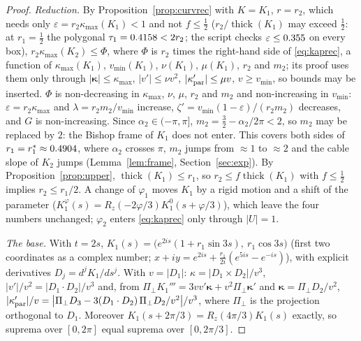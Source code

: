 \documentclass[10pt,a4paper]{article}
\theoremstyle{plain}
\theoremstyle{definition}
\theoremstyle{remark}
\newcommand{\thick}{\operatorname{thick}}
\begin{document}
\begin{proof}
\emph{Reduction.} By Proposition~\ref{prop:curvrec} with $K=K_1$, $r=r_2$, which needs only $\varepsilon=r_2\kappa_{\max}(K_1)<1$ and not $f\le\frac12$ ($r_2/\thick(K_1)$ may exceed $\frac12$: at $r_1=\frac12$ the polygonal $\tau_1=0.4158<2r_2$; the script checks $\varepsilon\le0.355$ on every box), $r_2\kappa_{\max}(K_2)\le\Phi$, where $\Phi$ is $r_2$ times the right-hand side of \eqref{eq:kaprec}, a function of $\kappa_{\max}(K_1)$, $v_{\min}(K_1)$, $\nu(K_1)$, $\mu(K_1)$, $r_2$ and $m_2$; its proof uses them only through $|\boldsymbol\kappa|\le\kappa_{\max}$, $|v'|\le\nu v^2$, $|\kappa_{\rm par}'|\le\mu v$, $v\ge v_{\min}$, so bounds may be inserted. $\Phi$ is non-decreasing in $\kappa_{\max}$, $\nu$, $\mu$, $r_2$ and $m_2$ and non-increasing in $v_{\min}$: $\varepsilon=r_2\kappa_{\max}$ and $\lambda=r_2m_2/v_{\min}$ increase, $\zeta'=v_{\min}(1-\varepsilon)/(r_2m_2)$ decreases, and $G$ is non-increasing. Since $\alpha_2\in(-\pi,\pi]$, $m_2=\frac32-\alpha_2/2\pi<2$, so $m_2$ may be replaced by $2$: the Bishop frame of $K_1$ does not enter. This covers both sides of $r_1=r_1^\ast\approx0.4904$, where $\alpha_2$ crosses $\pi$, $m_2$ jumps from $\approx1$ to $\approx2$ and the cable slope of $K_2$ jumps (Lemma~\ref{lem:frame}, Section~\ref{sec:exp}). By Proposition~\ref{prop:upper}, $\thick(K_1)\le r_1$, so $r_2\le f\thick(K_1)$ with $f\le\frac12$ implies $r_2\le r_1/2$. A change of $\varphi_1$ moves $K_1$ by a rigid motion and a shift of the parameter ($K_1^{\varphi}(s)=R_z(-2\varphi/3)K_1^{0}(s+\varphi/3)$), which leave the four numbers unchanged; $\varphi_2$ enters \eqref{eq:kaprec} only through $|U|=1$.

\emph{The base.} With $t=2s$, $K_1(s)=\bigl(e^{2is}(1+r_1\sin3s),\ r_1\cos3s\bigr)$ (first two coordinates as a complex number; $x+iy=e^{2is}+\frac{r_1}{2i}(e^{5is}-e^{-is})$), with explicit derivatives $D_j=d^jK_1/ds^j$. With $v=|D_1|$: $\kappa=|D_1\times D_2|/v^3$, $|v'|/v^2=|D_1\cdot D_2|/v^3$ and, from $\Pi_\perp K_1'''=3vv'\boldsymbol\kappa+v^2\Pi_\perp\boldsymbol\kappa'$ and $\boldsymbol\kappa=\Pi_\perp D_2/v^2$, $|\kappa_{\rm par}'|/v=\bigl|\Pi_\perp D_3-3(D_1\cdot D_2)\,\Pi_\perp D_2/v^2\bigr|/v^3$, where $\Pi_\perp$ is the projection orthogonal to $D_1$. Moreover $K_1(s+2\pi/3)=R_z(4\pi/3)K_1(s)$ exactly, so suprema over $[0,2\pi]$ equal suprema over $[0,2\pi/3]$.


\end{proof}
\end{document}
